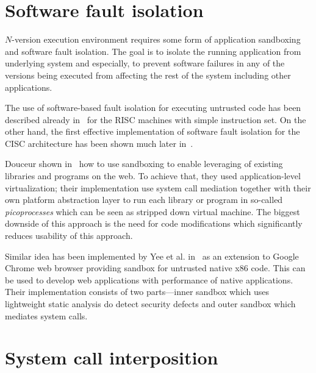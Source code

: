 \section{Software fault isolation}

$N$-version execution environment requires some form of application sandboxing
and software fault isolation. The goal is to isolate the running application
from underlying system and especially, to prevent software failures in any of
the versions being executed from affecting the rest of the system including
other applications.

The use of software-based fault isolation for executing untrusted code has
been described already in~\cite{sfi:sosp93} for the RISC machines with simple
instruction set. On the other hand, the first effective implementation of
software fault isolation for the CISC architecture has been shown much later
in~\cite{cisc-sfi:usenix-sec06}.

Douceur \etal shown in~\cite{douceur08} how to use sandboxing to enable
leveraging of existing libraries and programs on the web. To achieve that, they
used application-level virtualization; their implementation use system call
mediation together with their own platform abstraction layer to run each
library or program in so-called \emph{picoprocesses} which can be seen as
stripped down virtual machine. The biggest downside of this approach is the
need for code modifications which significantly reduces usability of this
approach.

Similar idea has been implemented by Yee et al. in~\cite{nacl} as an
extension to Google Chrome web browser providing sandbox for untrusted native
x86 code.  This can be used to develop web applications with performance of
native applications. Their implementation consists of two parts---inner sandbox
which uses lightweight static analysis do detect security defects and outer
sandbox which mediates system calls. %

\section{System call interposition}

